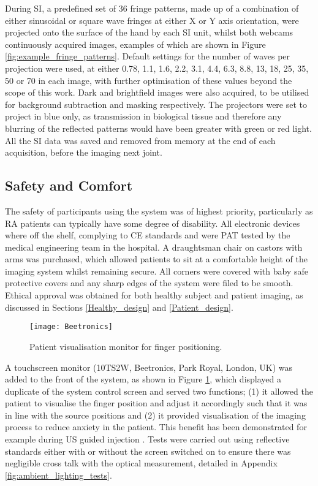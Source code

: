 \documentclass[twoside]{bhamthesis}
\theoremstyle{definition}
\begin{document}
During SI, a predefined set of 36 fringe patterns, made up of a combination of either sinusoidal or square wave fringes at either X or Y axis orientation, were projected onto the surface of the hand by each SI unit, whilst both webcams continuously acquired images, examples of which are shown in Figure \ref{fig:example_fringe_patterns}. Default settings for the number of waves per projection were used, at either 0.78, 1.1, 1.6, 2.2, 3.1, 4.4, 6.3, 8.8, 13, 18, 25, 35, 50 or 70 in each image, with further optimisation of these values beyond the scope of this work. Dark and brightfield images were also acquired, to be utilised for background subtraction and masking respectively. The projectors were set to project in blue only, as transmission in biological tissue and therefore any blurring of the reflected patterns would have been greater with green or red light. All the SI data was saved and removed from memory at the end of each acquisition, before the imaging next joint.

\subsection{Safety and Comfort}

The safety of participants using the system was of highest priority, particularly as RA patients can typically have some degree of disability. All electronic devices where off the shelf, complying to CE standards and were PAT tested by the medical engineering team in the hospital. A draughtsman chair on castors with arms was purchased, which allowed patients to sit at a comfortable height of the imaging system whilst remaining secure. All corners were covered with baby safe protective covers and any sharp edges of the system were filed to be smooth. Ethical approval was obtained for both healthy subject and patient imaging, as discussed in Sections \ref{Healthy_design} and \ref{Patient_design}.

\begin{figure}[!ht]
\centering
  \centering
  \texttt{[image: Beetronics]}
\caption{Patient visualisation monitor for finger positioning.}
  \label{fig:visualisation monitor}
\end{figure}

A touchscreen monitor (10TS2W, Beetronics, Park Royal, London, UK) was added to the front of the system, as shown in Figure \ref{fig:visualisation monitor}, which displayed a duplicate of the system control screen and served two functions; (1) it allowed the patient to visualise the finger position and adjust it accordingly such that it was in line with the source positions and (2) it provided visualisation of the imaging process to reduce anxiety in the patient. This benefit has been demonstrated for example during US guided injection \cite{sahbudin2015observing}. Tests were carried out using reflective standards either with or without the screen switched on to ensure there was negligible cross talk with the optical measurement, detailed in Appendix \ref{fig:ambient_lighting_tests}. 
\end{document}
